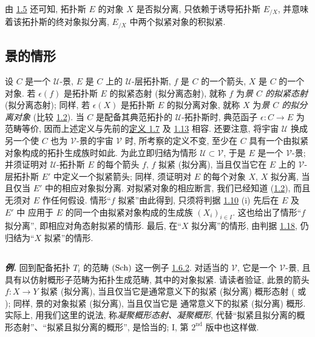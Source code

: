 \setcounter{subsection}{20}
\setcounter{subsubsection}{1}
\subsubsection{}
由 \hyperref[VI.rem1.5.1]{1.5} 还可知,
拓扑斯 $E$ 的对象 $X$ 是否拟分离,
只依赖于诱导拓扑斯 $E_{/X}$,
并意味着该拓扑斯的终对象拟分离,
\ie $E_{/X}$ 中两个拟紧对象的积拟紧.




\subsection{景的情形}\pageoriginale

设 $C$ 是一个 $𝒰$-景,
$E$ 是 $C$ 上的 $𝒰$-层拓扑斯,
$f$ 是 $C$ 的一个箭头, $X$ 是 $C$ 的一个对象.
若 $\epsilon(f)$ 是拓扑斯 $E$ 的拟紧态射 (\resp 拟分离态射),
就称 $f$ 为\emph{景 $C$ 的拟紧态射} (\resp 拟分离态射);
同样, 若 $\epsilon(X)$ 是拓扑斯 $E$ 的拟分离对象,
就称 $X$ 为\emph{景 $C$ 的拟分离对象}
(比较 \hyperref[VI.prop1.2]{1.2}).
当 $C$ 是配备其典范拓扑的 $𝒰$-拓扑斯时,
典范函子 $\epsilon:C\to E$ 为范畴等价,
因而上述定义与先前的\hyperref[VI.def1.7]{定义 1.7}
及 \hyperref[VI.def1.13]{1.13} 相容.
还要注意, 将宇宙 $𝒰$ 换成另一个使 $C$ 也为 $𝒱$-景的宇宙 $𝒱$ 时,
所考察的定义不变, 至少在 $C$ 具有一个由拟紧对象构成的拓扑生成族时如此.
为此立即归结为情形 $𝒰\subset 𝒱$,
于是 $E$ 是一个 $𝒱$-景;
并须证明对 $𝒰$-拓扑斯 $E$ 的每个箭头 $f$,
$f$ 拟紧 (\resp 拟分离), 当且仅当它在 $E$ 上的 $𝒱$-层拓扑斯 $E'$
中定义一个拟紧箭头;
同样, 须证明对 $E$ 的每个对象 $X$,
$X$ 拟分离, 当且仅当 $E'$ 中的相应对象拟分离.
对拟紧对象的相应断言, 我们已经知道
(\hyperref[VI.prop1.2]{1.2}), 而且无须对 $E$ 作任何假设.
情形“$f$ 拟紧”由此得到,
只须将判据 \hyperref[VI.prop1.10]{1.10} (i)
先后在 $E$ 及\pageoriginale{} $E'$ 中
应用于 $E$ 的同一个由拟紧对象构成的生成族 $(X_i)_{i\in I}$.
这也给出了情形“$f$ 拟分离”,
即相应对角态射拟紧的情形.
最后, 在“$X$ 拟分离”的情形,
由判据 \hyperref[VI.cor1.18]{1.18},
仍归结为“$X$ 拟紧”的情形.

\subsection{}
{\textit{\textbf{例.}}}
回到配备拓扑 $T_i$ 的范畴 $(\operatorname{Sch})$
这一例子 \hyperref[VI.subsubsec1.6.2]{1.6.2}.
对适当的 $𝒱$, 它是一个 $𝒱$-景,
且具有以仿射概形子范畴为拓扑生成范畴,
其中的对象拟紧.
请读者验证, 此景的箭头 $f:X\to Y$ 拟紧 (\resp 拟分离),
当且仅当它是通常意义下的拟紧 (\resp 拟分离) 概形态射
(\cite{sga4.exp.VI.bib.3} 或 \cite{sga4.exp.VI.bib.4});
同样, 景的对象拟紧 (\resp 拟分离),
当且仅当它是 \loccit{} 通常意义下的拟紧 (\resp 拟分离) 概形.
实际上, 用我们这里的说法, 称\emph{凝聚概形态射、凝聚概形},
代替“拟紧且拟分离的概形态射”、“拟紧且拟分离的概形”, 是恰当的;
\EGA I, 第 $2^{\text{nd}}$ 版中也这样做.

